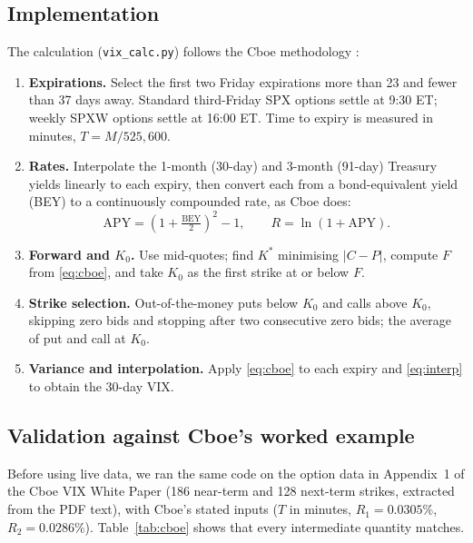 \documentclass[12pt]{article}
\begin{document}
\subsection{Implementation}

The calculation (\texttt{vix\_calc.py}) follows the Cboe methodology \cite{cboemeth}:
\begin{enumerate}
  \item \textbf{Expirations.} Select the first two Friday expirations more than 23 and fewer than 37 days away. Standard third-Friday SPX options settle at 9:30 ET; weekly SPXW options settle at 16:00 ET. Time to expiry is measured in minutes, $T=M/525{,}600$.
  \item \textbf{Rates.} Interpolate the 1-month (30-day) and 3-month (91-day) Treasury yields linearly to each expiry, then convert each from a bond-equivalent yield (BEY) to a continuously compounded rate, as Cboe does:
  \[ \mathrm{APY}=\left(1+\tfrac{\mathrm{BEY}}{2}\right)^2-1, \qquad R=\ln(1+\mathrm{APY}). \]
  \item \textbf{Forward and $K_0$.} Use mid-quotes; find $K^*$ minimising $|C-P|$, compute $F$ from \eqref{eq:cboe}, and take $K_0$ as the first strike at or below $F$.
  \item \textbf{Strike selection.} Out-of-the-money puts below $K_0$ and calls above $K_0$, skipping zero bids and stopping after two consecutive zero bids; the average of put and call at $K_0$.
  \item \textbf{Variance and interpolation.} Apply \eqref{eq:cboe} to each expiry and \eqref{eq:interp} to obtain the 30-day VIX.
\end{enumerate}

\subsection{Validation against Cboe's worked example}

Before using live data, we ran the same code on the option data in Appendix~1 of the Cboe VIX White Paper \cite{cboewp} (186 near-term and 128 next-term strikes, extracted from the PDF text), with Cboe's stated inputs ($T$ in minutes, $R_1=0.0305\%$, $R_2=0.0286\%$). Table~\ref{tab:cboe} shows that every intermediate quantity matches.
\end{document}
